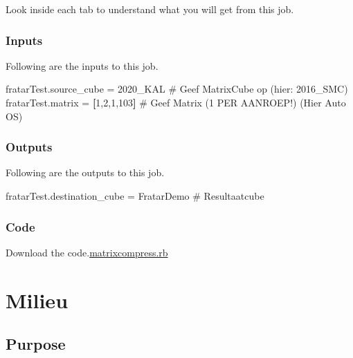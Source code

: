 \documentclass[
  letterpaper,
  DIV=11,
  numbers=noendperiod]{scrreprt}
\newenvironment{Shaded}{\begin{snugshade}}{\end{snugshade}}
\newcommand{\AttributeTok}[1]{\textcolor[rgb]{0.40,0.45,0.13}{#1}}
\newcommand{\CommentTok}[1]{\textcolor[rgb]{0.37,0.37,0.37}{#1}}
\newcommand{\DecValTok}[1]{\textcolor[rgb]{0.68,0.00,0.00}{#1}}
\newcommand{\KeywordTok}[1]{\textcolor[rgb]{0.00,0.23,0.31}{\textbf{#1}}}
\newcommand{\NormalTok}[1]{\textcolor[rgb]{0.00,0.23,0.31}{#1}}
\newcommand{\OperatorTok}[1]{\textcolor[rgb]{0.37,0.37,0.37}{#1}}
\newcommand{\VerbatimStringTok}[1]{\textcolor[rgb]{0.13,0.47,0.30}{#1}}
\begin{document}
Look inside each tab to understand what you will get from this job.

\subsection{Inputs}

Following are the inputs to this job.

\begin{Shaded}
\begin{Highlighting}[]
\NormalTok{fratarTest}\AttributeTok{.source\_cube} \OperatorTok{=} \VerbatimStringTok{\textquotesingle{}2020\_KAL\textquotesingle{}} \CommentTok{\# Geef MatrixCube op (hier: 2016\_SMC)        }
\NormalTok{fratarTest}\AttributeTok{.matrix} \OperatorTok{=} \KeywordTok{[}\DecValTok{1}\NormalTok{,}\DecValTok{2}\NormalTok{,}\DecValTok{1}\NormalTok{,}\DecValTok{103}\KeywordTok{]}     \CommentTok{\# Geef Matrix (1 PER AANROEP!) (Hier Auto OS)}
\end{Highlighting}
\end{Shaded}

\subsection{Outputs}

Following are the outputs to this job.

\begin{Shaded}
\begin{Highlighting}[]
\NormalTok{fratarTest}\AttributeTok{.destination\_cube} \OperatorTok{=} \VerbatimStringTok{\textquotesingle{}FratarDemo\textquotesingle{}} \CommentTok{\# Resultaatcube }
\end{Highlighting}
\end{Shaded}

\subsection{Code}

Download the code.\href{../../first.rb}{matrixcompress.rb}

\chapter{Milieu}\label{milieu}

\section{Purpose}
\end{document}

